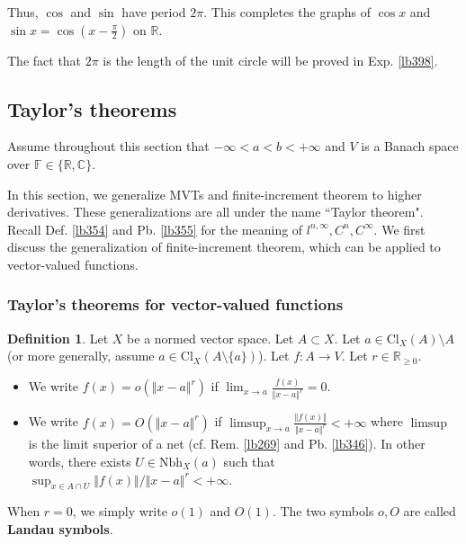 \documentclass[12pt,b5paper,notitlepage]{article}
\theoremstyle{definition}
\newtheorem{df}{Definition}[section]
\theoremstyle{plain}
\newcommand{\Cbb}{\mathbb C}
\newcommand{\Rbb}{\mathbb R}
\newcommand{\Fbb}{\mathbb F}
\newcommand{\dps}{\displaystyle}
\newcommand{\Nbh}{\mathrm{Nbh}}
\newcommand{\Cl}{\mathrm{Cl}}
\numberwithin{equation}{section}
\begin{document}
Thus, $\cos$ and $\sin$ have period $2\pi$. This completes the graphs of $\cos x$ and $\sin x=\cos(x-\frac\pi2)$ on $\Rbb$.

The fact that $2\pi$ is the length of the unit circle will be proved in Exp. \ref{lb398}.



\subsection{Taylor's theorems}


Assume throughout this section that $-\infty<a<b<+\infty$ and $V$ is a Banach space over $\Fbb\in\{\Rbb,\Cbb\}$.


In this section, we generalize MVTs and finite-increment theorem to higher derivatives. These generalizations are all under the name ``Taylor theorem". Recall Def. \ref{lb354} and Pb. \ref{lb355} for the meaning of $l^{n,\infty},C^n,C^\infty$. We first discuss the generalization of finite-increment theorem, which can be applied to vector-valued functions.





 
\subsubsection{Taylor's theorems for vector-valued functions}



\begin{df}
Let $X$ be a normed vector space. Let $A\subset X$. Let $a\in\Cl_X(A)\setminus A$ (or more generally, assume $a\in\Cl_X(A\setminus \{a\})$). Let $f:A\rightarrow V$. Let $r\in\Rbb_{\geq0}$.
\begin{itemize}
\item We write $\dps f(x)=o(\Vert x-a\Vert^r)$ if $\dps\lim_{x\rightarrow a}\frac{f(x)}{\Vert x-a\Vert^r}=0$.
\item We write $\dps f(x)=O(\Vert x-a\Vert^r)$ if $\dps\limsup_{x\rightarrow a}\frac{\Vert f(x)\Vert}{\Vert x-a\Vert^r}<+\infty$ where $\limsup$ is the limit superior of a net (cf. Rem. \ref{lb269} and Pb. \ref{lb346}). In other words, there exists $U\in\Nbh_X(a)$ such that $\sup_{x\in A\cap U}\Vert f(x)\Vert/\Vert x-a\Vert^r<+\infty$.
\end{itemize}
When $r=0$, we simply write $o(1)$ and $O(1)$. The two symbols $o,O$ are called \textbf{Landau symbols}. 
\end{df}
\end{document}
